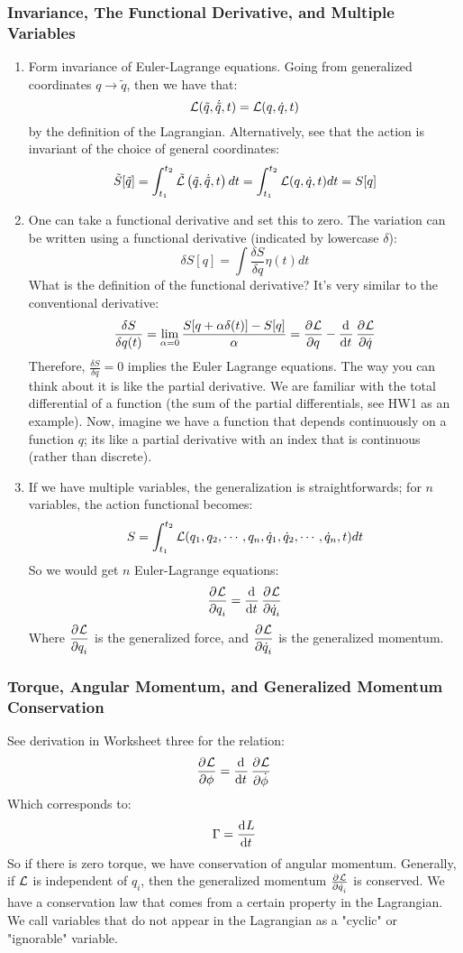 \subsubsection{Invariance, The Functional Derivative, and Multiple Variables}
\begin{enumerate}
    \item Form invariance of Euler-Lagrange equations. Going from generalized coordinates $q \rightarrow \tilde{q}$, then we have that:
    \[\mathcal{L}(\tilde{q}, \dot{\tilde{q}}, t) = \mathcal{L}(q, \dot{q}, t)\]
    by the definition of the Lagrangian. Alternatively, see that the action is invariant of the choice of general coordinates:
    \[\tilde{S}[\tilde{q}] = \int_{t_{1}}^{t_2} \tilde{\mathcal{L}}\left(\tilde{q}, \dot{\tilde{q}}, t\right) d t=\int_{t_{1}}^{t_2} \mathcal{L}(q, \dot{q}, t) d t=S[q]\]
    \item One can take a functional derivative and set this to zero. The variation can be written using a functional derivative (indicated by lowercase $\delta$):
    \[\delta S[q] = \int \frac{\delta S}{\delta q} \eta(t) dt\]
    What is the definition of the functional derivative? It's very similar to the conventional derivative:
    \[\frac{\delta S}{\delta q(t)} = \lim_{\alpha = 0} \frac{S[q + \alpha \delta(t)] - S[q]}{\alpha} = \dpd{\LL}{q} - \dod{}{t}\dpd{\LL}{\dot{q}}\]
    Therefore, $\frac{\delta S}{\delta q} = 0$ implies the Euler Lagrange equations. The way you can think about it is like the partial derivative. We are familiar with the total differential of a function (the sum of the partial differentials, see HW1 as an example). Now, imagine we have a function that depends continuously on a function $q$; its like a partial derivative with an index that is continuous (rather than discrete). 
    \item If we have multiple variables, the generalization is straightforwards; for $n$ variables, the action functional becomes:
    \[S = \int_{t_1}^{t_2}\mathcal{L}(q_1, q_2, \cdots, q_n, \dot{q}_1, \dot{q}_2, \cdots, \dot{q}_n, t)dt\]
    So we would get $n$ Euler-Lagrange equations:
    \[\dpd{\LL}{q_i} = \dod{}{t}\dpd{\LL}{\dot{q}_i}\]
    Where $\dpd{\LL}{q_i}$ is  the generalized force, and $\dpd{\LL}{\dot{q}_i}$ is the generalized momentum. 
\end{enumerate}

\subsubsection{Torque, Angular Momentum, and Generalized Momentum Conservation}
See derivation in Worksheet three for the relation:
\[\dpd{\LL}{\phi} = \dod{}{t}\dpd{\LL}{\dot{\phi}}\]
Which corresponds to:
\[\Gamma = \dod{L}{t}\]
So if there is zero torque, we have conservation of angular momentum. Generally, if $\mathcal{L}$ is independent of $q_i$, then the generalized momentum $\pd{\LL}{\dot{q}_i}$ is conserved. We have a conservation law that comes from a certain property in the Lagrangian. We call variables that do not appear in the Lagrangian as a "cyclic" or "ignorable" variable.